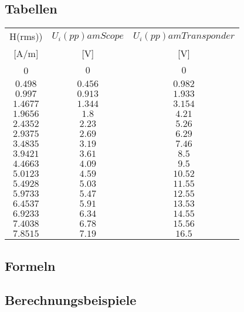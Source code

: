 \documentclass[12pt,a4paper,ngerman]{article}
\begin{document}
\subsection{Tabellen}
\begin{tabular}{ |c|c|c| }
  \hline

    H(rms)) & $U_i(pp) am Scope$ & $U_i(pp) am Transponder$\\

	[A/m] & [V] & [V] \\
  \hline
  0 & $0$ & $0$\\
  \hline
  $0.498$ & $0.456$ & $0.982$ \\
  \hline
  $0.997$ & $0.913$ & $1.933$\\
  \hline
  $1.4677$ & $1.344$ & $3.154$\\
    \hline
  $1.9656$ & $1.8$ & $4.21$\\
    \hline
  $2.4352$ & $2.23$ & $5.26$ \\
    \hline
  $2.9375$ & $2.69$ & $6.29$\\
     \hline
  $3.4835$ & $3.19$ & $7.46$ \\ 
    \hline
  $3.9421$ & $3.61$ & $8.5$  \\
    \hline
  $4.4663$ & $4.09$ & $9.5$  \\
    \hline
  $5.0123$ & $4.59$ & $10.52$  \\
    \hline
  $5.4928$ & $5.03$ & $11.55$  \\
    \hline
  $5.9733$ & $5.47$ & $12.55$ \\
     \hline
  $6.4537$ & $5.91$ & $13.53$ \\
      \hline
  $6.9233$ & $6.34$ & $14.55$ \\ 
      \hline
  $7.4038$ & $6.78$ & $15.56$  \\
      \hline
  $7.8515$ & $7.19$ & $16.5$  \\
      \hline
  \hline
 
\end{tabular} 
\subsection{Formeln}

\subsection{Berechnungsbeispiele}


\pagebreak
\end{document}
